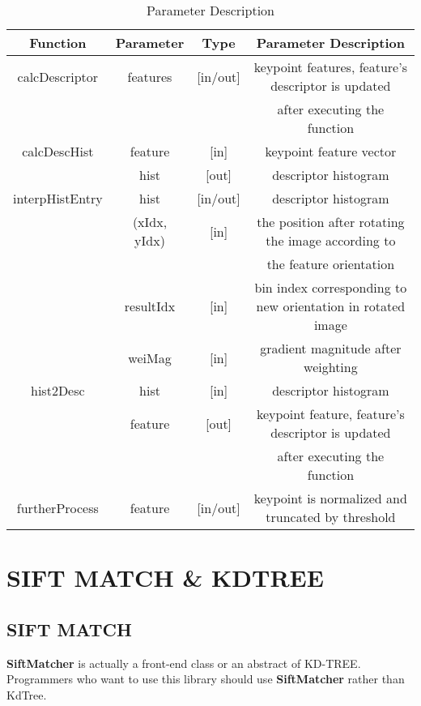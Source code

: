 \documentclass[paper=a4, fontsize=11pt]{scrartcl} %
\numberwithin{equation}{section} %
\numberwithin{figure}{section} %
\numberwithin{table}{section} %
\begin{document}
\begin{table}[h]
    \centering
    \begin{tabular}{|c|c|c|c|}
        \hline
        \textbf{Function} & \textbf{Parameter} & \textbf{Type} & \textbf{Parameter Description} \\\hline
        calcDescriptor & features & [in/out] & keypoint features, feature's descriptor is updated\\
        & &  & after executing the function\\\hline
        calcDescHist & feature & [in] & keypoint feature vector \\
            & hist & [out] & descriptor histogram\\\hline
        interpHistEntry & hist & [in/out] & descriptor histogram \\
        & (xIdx, yIdx)& [in] & the position after rotating the image according to\\
        & &  & the feature orientation\\
        & resultIdx & [in] & bin index corresponding to new orientation in rotated image\\
                        & weiMag & [in] & gradient magnitude after weighting \\\hline
        hist2Desc & hist & [in] & descriptor histogram \\
                  & feature  & [out] & keypoint feature, feature's descriptor is updated \\
                  & &  & after executing the function\\\hline
        furtherProcess & feature & [in/out] & keypoint is normalized and truncated by threshold \\\hline
    \end{tabular}
    \caption{Parameter Description}\label{nolock}
\end{table}

\clearpage

\section{SIFT MATCH \& KDTREE} 

\subsection{SIFT MATCH}\label{sec-sift-match}

\textbf{SiftMatcher} is actually a front-end class or an abstract of KD-TREE. Programmers who want to use this library should use \textbf{SiftMatcher} rather than {KdTree}.  \\
\end{document}
